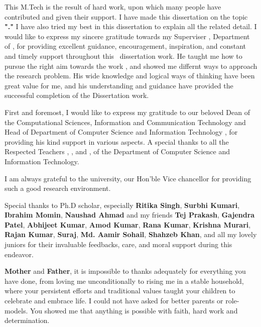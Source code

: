 
\begin{acknowledgements}
\addchaptertocentry{\acknowledgementname} %
\vspace*{2cm}
This M.Tech \rType is the result of hard work, upon which many people have contributed and given their support. I
have made this dissertation on the topic \textbf{"\ReportTitel ."} I have also tried my best in this dissertation to
explain all the related detail. I would like to express my sincere gratitude towards my Superviser \textbf{
	\Supervisor}, Department of \depS, for providing excellent guidance, encouragement, inspiration, and constant and
timely support throughout this \DegreeS \  dissertation work. He taught me how to pursue the right aim towards the work
, and showed me differnt ways to approach the research problem. His wide knowledge and logical ways of thinking have
been great value for me, and his understanding and guidance have provided the successful completion of the
Dissertation work.

First and foremost, I would like to express my gratitude to our beloved Dean of the Computational Sciences,
Information and Communication Technology and Head of Department of Computer Science and Information Technology \textbf{\HodName},
for providing his kind support in various aspects. A special thanks to all the Respected Teachers
\textbf{\Facone}, \textbf{\Factwo}, and \textbf{\Facthree}, of the Department of Computer Science and Information
Technology.

I am always grateful to the university, our Hon’ble Vice chancellor \textbf{\Vc} for providing
such a good research environment.

	Special thanks to Ph.D scholar, especially \textbf{Ritika Singh}, \textbf{Surbhi Kumari}, \textbf{Ibrahim Momin},
\textbf{Naushad Ahmad} and  my friends \textbf{Tej Prakash}, \textbf{Gajendra Patel}, \textbf{Abhijeet Kumar},
\textbf{Amod Kumar}, \textbf{Rana Kumar}, \textbf{Krishna Murari}, \textbf{Rajan Kumar}, \textbf{Suraj}, \textbf{Md.
Aamir Sohail}, \textbf{
	Shahzeb Khan},
and all my lovely juniors  for their invaluable feedbacks, care, and moral support during this endeavor.

	\textbf{Mother} and \textbf{Father}, it is impossible to thanks adequately for everything you have done, from
loving me unconditionally to rising me in a stable household, where your persistent efforts and traditional values
taught your children to celebrate and embrace life. I could not have asked for better parents or role-models. You
showed me that anything is possible with faith, hard work and determination. 



\end{acknowledgements}

